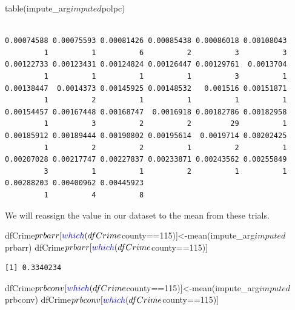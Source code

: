 \documentclass[]{article}
\newenvironment{Shaded}{}{}
\newcommand{\DecValTok}[1]{#1}
\newcommand{\KeywordTok}[1]{\textcolor[rgb]{0.00,0.00,1.00}{#1}}
\newcommand{\NormalTok}[1]{#1}
\newcommand{\OperatorTok}[1]{#1}
\begin{document}
\begin{Shaded}
\begin{Highlighting}[]
\KeywordTok{table}\NormalTok{(impute_arg}\OperatorTok{$}\NormalTok{imputed}\OperatorTok{$}\NormalTok{polpc)}
\end{Highlighting}
\end{Shaded}

\begin{verbatim}

0.00074588 0.00075593 0.00081426 0.00085438 0.00086018 0.00108043 
         1          1          6          2          3          3 
0.00122733 0.00123431 0.00124824 0.00126447 0.00129761  0.0013704 
         1          1          1          1          3          1 
0.00138447  0.0014373 0.00145925 0.00148532   0.001516 0.00151871 
         1          2          1          1          1          1 
0.00154457 0.00167448 0.00168747  0.0016918 0.00182786 0.00182958 
         1          3          2          2         29          1 
0.00185912 0.00189444 0.00190802 0.00195614  0.0019714 0.00202425 
         1          2          2          1          2          1 
0.00207028 0.00217747 0.00227837 0.00233871 0.00243562 0.00255849 
         3          1          1          2          1          1 
0.00288203 0.00400962 0.00445923 
         1          4          8 
\end{verbatim}

We will reassign the value in our dataset to the mean from these trials.

\begin{Shaded}
\begin{Highlighting}[]
\NormalTok{dfCrime}\OperatorTok{$}\NormalTok{prbarr[}\KeywordTok{which}\NormalTok{(dfCrime}\OperatorTok{$}\NormalTok{county}\OperatorTok{==}\DecValTok{115}\NormalTok{)]<-}\KeywordTok{mean}\NormalTok{(impute_arg}\OperatorTok{$}\NormalTok{imputed}\OperatorTok{$}\NormalTok{prbarr)}
\NormalTok{dfCrime}\OperatorTok{$}\NormalTok{prbarr[}\KeywordTok{which}\NormalTok{(dfCrime}\OperatorTok{$}\NormalTok{county}\OperatorTok{==}\DecValTok{115}\NormalTok{)]}
\end{Highlighting}
\end{Shaded}

\begin{verbatim}
[1] 0.3340234
\end{verbatim}

\begin{Shaded}
\begin{Highlighting}[]
\NormalTok{dfCrime}\OperatorTok{$}\NormalTok{prbconv[}\KeywordTok{which}\NormalTok{(dfCrime}\OperatorTok{$}\NormalTok{county}\OperatorTok{==}\DecValTok{115}\NormalTok{)]<-}\KeywordTok{mean}\NormalTok{(impute_arg}\OperatorTok{$}\NormalTok{imputed}\OperatorTok{$}\NormalTok{prbconv)}
\NormalTok{dfCrime}\OperatorTok{$}\NormalTok{prbconv[}\KeywordTok{which}\NormalTok{(dfCrime}\OperatorTok{$}\NormalTok{county}\OperatorTok{==}\DecValTok{115}\NormalTok{)]}
\end{Highlighting}
\end{Shaded}
\end{document}
